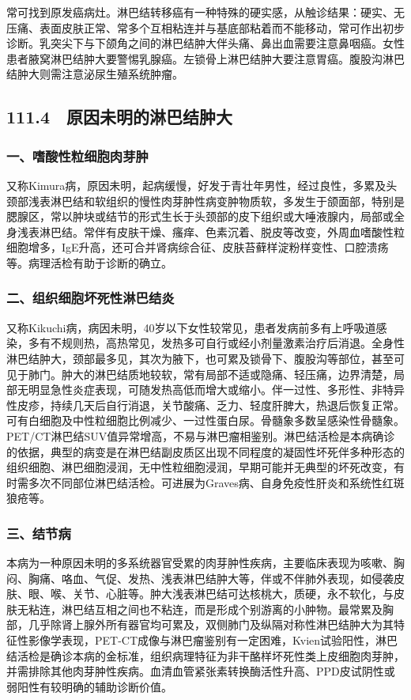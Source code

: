 常可找到原发癌病灶。淋巴结转移癌有一种特殊的硬实感，从触诊结果：硬实、无压痛、表面皮肤正常、常多个互相粘连并与基底部粘着而不能移动，常可作出初步诊断。乳突尖下与下颌角之间的淋巴结肿大伴头痛、鼻出血需要注意鼻咽癌。女性患者腋窝淋巴结肿大要警惕乳腺癌。左锁骨上淋巴结肿大要注意胃癌。腹股沟淋巴结肿大则需注意泌尿生殖系统肿瘤。

\subsection{111.4　原因未明的淋巴结肿大}

\subsubsection{一、嗜酸性粒细胞肉芽肿}

又称Kimura病，原因未明，起病缓慢，好发于青壮年男性，经过良性，多累及头颈部浅表淋巴结和软组织的慢性肉芽肿性病变肿物质软，多发生于颌面部，特别是腮腺区，常以肿块或结节的形式生长于头颈部的皮下组织或大唾液腺内，局部或全身浅表淋巴结。常伴有皮肤干燥、瘙痒、色素沉着、脱皮等改变，外周血嗜酸性粒细胞增多，IgE升高，还可合并肾病综合征、皮肤苔藓样淀粉样变性、口腔溃疡等。病理活检有助于诊断的确立。

\subsubsection{二、组织细胞坏死性淋巴结炎}

又称Kikuchi病，病因未明，40岁以下女性较常见，患者发病前多有上呼吸道感染，多有不规则热，高热常见，发热多可自行或经小剂量激素治疗后消退。全身性淋巴结肿大，颈部最多见，其次为腋下，也可累及锁骨下、腹股沟等部位，甚至可见于肺门。肿大的淋巴结质地较软，常有局部不适或隐痛、轻压痛，边界清楚，局部无明显急性炎症表现，可随发热高低而增大或缩小。伴一过性、多形性、非特异性皮疹，持续几天后自行消退，关节酸痛、乏力、轻度肝脾大，热退后恢复正常。可有白细胞及中性粒细胞比例减少、一过性蛋白尿。骨髓象多数呈感染性骨髓象。PET/CT淋巴结SUV值异常增高，不易与淋巴瘤相鉴别。淋巴结活检是本病确诊的依据，典型的病变是在淋巴结副皮质区出现不同程度的凝固性坏死伴多种形态的组织细胞、淋巴细胞浸润，无中性粒细胞浸润，早期可能并无典型的坏死改变，有时需多次不同部位淋巴结活检。可进展为Graves病、自身免疫性肝炎和系统性红斑狼疮等。

\subsubsection{三、结节病}

本病为一种原因未明的多系统器官受累的肉芽肿性疾病，主要临床表现为咳嗽、胸闷、胸痛、咯血、气促、发热、浅表淋巴结肿大等，伴或不伴肺外表现，如侵袭皮肤、眼、喉、关节、心脏等。肿大浅表淋巴结可达核桃大，质硬，永不软化，与皮肤无粘连，淋巴结互相之间也不粘连，而是形成个别游离的小肿物。最常累及胸部，几乎除肾上腺外所有器官均可累及，双侧肺门及纵隔对称性淋巴结肿大为其特征性影像学表现，PET-CT成像与淋巴瘤鉴别有一定困难，Kvien试验阳性，淋巴结活检是确诊本病的金标准，组织病理特征为非干酪样坏死性类上皮细胞肉芽肿，并需排除其他肉芽肿性疾病。血清血管紧张素转换酶活性升高、PPD皮试阴性或弱阳性有较明确的辅助诊断价值。


